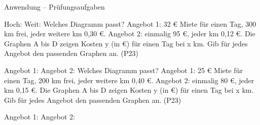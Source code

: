 \begin{aufgabe}{Anwendung – Prüfungsaufgaben}
\begin{teile}
\begin{ksys}[xmin=0,xmax=12,ymin=0,ymax=100,xstep=1,ystep=10,xlabel=x in Monaten,ylabel=y in €,ablesen]   \end{ksys}
Hoch: \leerfeld \quad Weit: \leerfeld
\teil Welches Diagramm passt? Angebot 1: 32 € Miete für einen Tag, 300 km frei, jeder weitere km 0{,}30 €. Angebot 2: einmalig 95 €, jeder km 0{,}12 €. Die Graphen A bis D zeigen Kosten y (in €) für einen Tag bei x km. Gib für jedes Angebot den passenden Graphen an. \hfill (P23) \\

\begin{ksys}[xmin=0,xmax=600,ymin=0,ymax=200,xstep=100,ystep=20,xlabel=x in km,ylabel=y in €,ablesen]     \end{ksys}
Angebot 1: \leerfeld \quad Angebot 2: \leerfeld
\teil Welches Diagramm passt? Angebot 1: 25 € Miete für einen Tag, 200 km frei, jeder weitere km 0{,}40 €. Angebot 2: einmalig 80 €, jeder km 0{,}15 €. Die Graphen A bis D zeigen Kosten y (in €) für einen Tag bei x km. Gib für jedes Angebot den passenden Graphen an. \hfill (P23) \\

\begin{ksys}[xmin=0,xmax=500,ymin=0,ymax=160,xstep=100,ystep=20,xlabel=x in km,ylabel=y in €,ablesen]     \end{ksys}
Angebot 1: \leerfeld \quad Angebot 2: \leerfeld
\end{teile}
\end{aufgabe}

\medskip
{}
